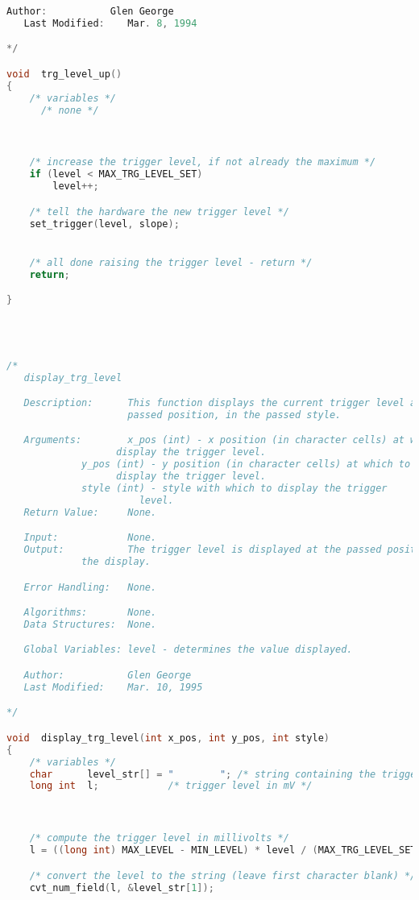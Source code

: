 \begin{lstlisting}[language=C]
   Author:           Glen George
   Last Modified:    Mar. 8, 1994

*/

void  trg_level_up()
{
    /* variables */
      /* none */



    /* increase the trigger level, if not already the maximum */
    if (level < MAX_TRG_LEVEL_SET)
        level++;

    /* tell the hardware the new trigger level */
    set_trigger(level, slope);


    /* all done raising the trigger level - return */
    return;

}




/*
   display_trg_level

   Description:      This function displays the current trigger level at the
                     passed position, in the passed style.

   Arguments:        x_pos (int) - x position (in character cells) at which to
   				   display the trigger level.
   		     y_pos (int) - y position (in character cells) at which to
   				   display the trigger level.
		     style (int) - style with which to display the trigger
		     		   level.
   Return Value:     None.

   Input:            None.
   Output:           The trigger level is displayed at the passed position on
   		     the display.

   Error Handling:   None.

   Algorithms:       None.
   Data Structures:  None.

   Global Variables: level - determines the value displayed.

   Author:           Glen George
   Last Modified:    Mar. 10, 1995

*/

void  display_trg_level(int x_pos, int y_pos, int style)
{
    /* variables */
    char      level_str[] = "        "; /* string containing the trigger level */
    long int  l;			/* trigger level in mV */



    /* compute the trigger level in millivolts */
    l = ((long int) MAX_LEVEL - MIN_LEVEL) * level / (MAX_TRG_LEVEL_SET - MIN_TRG_LEVEL_SET) + MIN_LEVEL;

    /* convert the level to the string (leave first character blank) */
    cvt_num_field(l, &level_str[1]);


\end{lstlisting}
